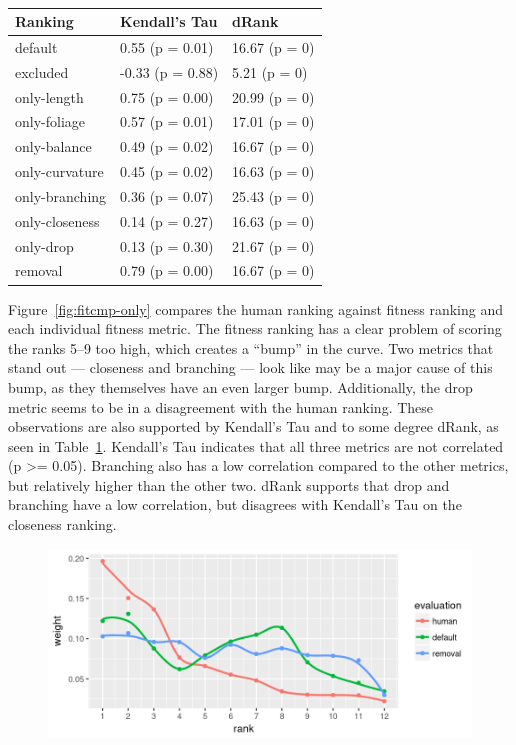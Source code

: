 \begin{table}
    \centering
    \begin{tabular}{| l | l | l |}
    \hline
    \textbf{Ranking} & \textbf{Kendall's Tau} & \textbf{dRank} \\
    \hline
            default & 0.55 (p = 0.01) & 16.67 (p = 0) \\
           excluded & -0.33 (p = 0.88) & 5.21 (p = 0) \\
        only-length & 0.75 (p = 0.00) & 20.99 (p = 0) \\
       only-foliage & 0.57 (p = 0.01) & 17.01 (p = 0) \\
       only-balance & 0.49 (p = 0.02) & 16.67 (p = 0) \\
     only-curvature & 0.45 (p = 0.02) & 16.63 (p = 0) \\
     only-branching & 0.36 (p = 0.07) & 25.43 (p = 0) \\
     only-closeness & 0.14 (p = 0.27) & 16.63 (p = 0) \\
          only-drop & 0.13 (p = 0.30) & 21.67 (p = 0) \\
            removal & 0.79 (p = 0.00) & 16.67 (p = 0) \\
    \hline
    \end{tabular}
    \caption{}
    \label{tab:rankstats}
\end{table}

Figure~\ref{fig:fitcmp-only} compares the human ranking against fitness ranking and each individual fitness metric.
The fitness ranking has a clear problem of scoring the ranks 5--9 too high, which creates a ``bump'' in the curve.
Two metrics that stand out --- closeness and branching --- look like may be a major cause of this bump, as they themselves have an even larger bump.
Additionally, the drop metric seems to be in a disagreement with the human ranking.
These observations are also supported by Kendall's Tau and to some degree dRank, as seen in Table~\ref{tab:rankstats}.
Kendall's Tau indicates that all three metrics are not correlated (p >= 0.05).
Branching also has a low correlation compared to the other metrics, but relatively higher than the other two.
dRank supports that drop and branching have a low correlation, but disagrees with Kendall's Tau on the closeness ranking.

\begin{figure}
    \centering
    \includegraphics[width=1.0\textwidth]{figures/fitcmp-removal}
    \caption{}
    \label{fig:fitcmp-removal}
\end{figure}

